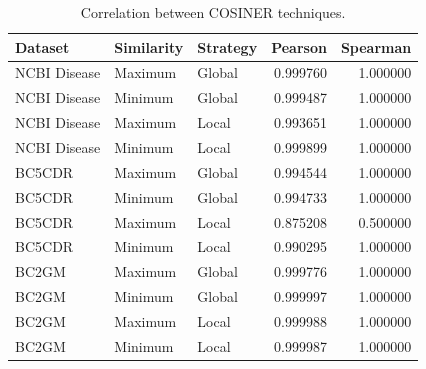 \begin{table}
    \footnotesize
    \centering
    \caption{Correlation between COSINER techniques.}\begin{tabular}{lllrr}
\toprule
Dataset & Similarity & Strategy & Pearson & Spearman \\
\midrule
NCBI Disease & Maximum & Global & 0.999760 & 1.000000 \\
NCBI Disease & Minimum & Global & 0.999487 & 1.000000 \\
NCBI Disease & Maximum & Local & 0.993651 & 1.000000 \\
NCBI Disease & Minimum & Local & 0.999899 & 1.000000 \\
BC5CDR & Maximum & Global & 0.994544 & 1.000000 \\
BC5CDR & Minimum & Global & 0.994733 & 1.000000 \\
BC5CDR & Maximum & Local & 0.875208 & 0.500000 \\
BC5CDR & Minimum & Local & 0.990295 & 1.000000 \\
BC2GM & Maximum & Global & 0.999776 & 1.000000 \\
BC2GM & Minimum & Global & 0.999997 & 1.000000 \\
BC2GM & Maximum & Local & 0.999988 & 1.000000 \\
BC2GM & Minimum & Local & 0.999987 & 1.000000 \\
\bottomrule
\end{tabular}
\end{table}